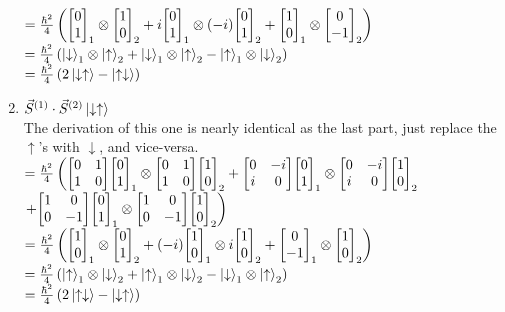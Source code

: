 \documentclass[12pt]{article}
\begin{document}
\begin{enumerate}[label=\alph*)]
$=\frac{\hbar^2}{4}\left(\mqty[0\\1]_1\otimes\mqty[1\\0]_2 + i\mqty[0\\1]_1\otimes(-i)\mqty[0\\1]_2 + \mqty[1\\0]_1\otimes\mqty[0\\-1]_2\right)$\vspace{0.5em}\\
$=\frac{\hbar^2}{4}\left(\ket{\downarrow}_1\otimes\ket{\uparrow}_2 + \ket{\downarrow}_1\otimes\ket{\uparrow}_2 - \ket{\uparrow}_1\otimes\ket{\downarrow}_2\right)$\vspace{0.5em}\\
$= \frac{\hbar^2}{4}\left(2\ket{\downarrow\uparrow}-\ket{\uparrow\downarrow}\right)$

\item 
\hspace{1em}$\vec{S}^{(1)} \cdot \vec{S}^{(2)} \ket{\downarrow \uparrow}$\vspace{0.5em}\\
The derivation of this one is nearly identical as the last part, just replace the $\uparrow$'s with $\downarrow$, and vice-versa.\vspace{0.5em}\\
$=\frac{\hbar^2}{4}\left(\mqty[0 & 1 \\ 1 & 0]\mqty[0\\1]_1\otimes\mqty[0&1 \\1 & 0]\mqty[1\\0]_2 + \mqty[0 & -i \\ i & 0]\mqty[0\\1]_1\otimes\mqty[0& -i \\ i &0]\mqty[1\\0]_2 \right.$\vspace{0.5em}\\
\hspace*{5em}$\left.+ \mqty[1 &0\\0 &-1]\mqty[0\\1]_1\otimes\mqty[1 & 0 \\ 0 & -1]\mqty[1\\0]_2\right)$\vspace{0.5em}\\
$=\frac{\hbar^2}{4}\left(\mqty[1\\0]_1\otimes\mqty[0\\1]_2 + (-i)\mqty[1\\0]_1\otimes i \mqty[1\\0]_2 + \mqty[0\\-1]_1\otimes\mqty[1\\0]_2\right)$\vspace{0.5em}\\
$=\frac{\hbar^2}{4}\left(\ket{\uparrow}_1\otimes\ket{\downarrow}_2 + \ket{\uparrow}_1\otimes\ket{\downarrow}_2 - \ket{\downarrow}_1\otimes\ket{\uparrow}_2\right)$\vspace{0.5em}\\
$= \frac{\hbar^2}{4}\left(2\ket{\uparrow\downarrow}-\ket{\downarrow\uparrow}\right)$


\end{enumerate}
\end{document}

